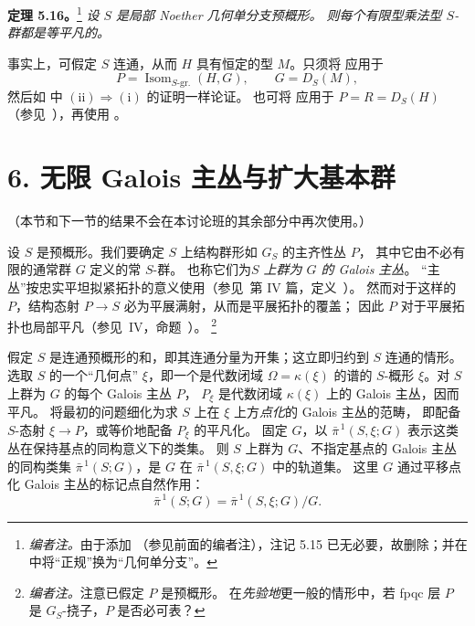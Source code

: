 \par\medskip\noindent
\textbf{定理 5.16。}\footnote{\textit{编者注。}由于添加 
（参见前面的编者注），注记 5.15 已无必要，故删除；并在
 中将“正规”换为“几何单分支”。}\enspace
\emph{设 \(S\) 是局部 Noether 几何单分支预概形。
则每个有限型乘法型 \(S\)-群都是等平凡的。}

事实上，可假定 \(S\) 连通，从而 \(H\) 具有恒定的型 \(M\)。只须将
 应用于
\[
  P=\operatorname{Isom}_{S\text{-gr.}}(H,G),
  \qquad G=D_S(M),
\]
然后如  中
\(\mathrm{(ii)}\Rightarrow\mathrm{(i)}\) 的证明一样论证。
也可将  应用于 \(P=R=D_S(H)\)
（参见\ ），再使用 。

\section*{6. 无限 Galois 主丛与扩大基本群}
{}

（本节和下一节的结果不会在本讨论班的其余部分中再次使用。）

设 \(S\) 是预概形。我们要确定 \(S\) 上结构群形如 \(G_S\) 的主齐性丛 \(P\)，
其中它由不必有限的通常群 \(G\) 定义的常 \(S\)-群。
也称它们为\emph{\(S\) 上群为 \(G\) 的 Galois 主丛}。
“主丛”按忠实平坦拟紧拓扑的意义使用（参见\ 第 IV 篇，定义~）。
然而对于这样的 \(P\)，结构态射 \(P\to S\) 必为平展满射，从而是平展拓扑的覆盖；
因此 \(P\) 对于平展拓扑也局部平凡（参见\ IV，命题~）。
\footnote{\textit{编者注。}注意已假定 \(P\) 是预概形。
在\emph{先验地}更一般的情形中，若 fpqc 层 \(P\) 是 \(G_S\)-挠子，\(P\) 是否必可表？}

假定 \(S\) 是连通预概形的和，即其连通分量为开集；这立即归约到 \(S\) 连通的情形。
选取 \(S\) 的一个“几何点” \(\xi\)，即一个是代数闭域 \(\Omega=\kappa(\xi)\)
的谱的 \(S\)-概形 \(\xi\)。对 \(S\) 上群为 \(G\) 的每个 Galois 主丛 \(P\)，
\(P_\xi\) 是代数闭域 \(\kappa(\xi)\) 上的 Galois 主丛，因而平凡。
将最初的问题细化为求 \(S\) 上在 \(\xi\) 上方\emph{点化}的 Galois 主丛的范畴，
即配备 \(S\)-态射 \(\xi\to P\)，或等价地配备 \(P_\xi\) 的平凡化。
固定 \(G\)，以 \(\bar\pi^{\,1}(S,\xi;G)\) 表示这类丛在保持基点的同构意义下的类集。
则 \(S\) 上群为 \(G\)、不指定基点的 Galois 主丛的同构类集
\(\bar\pi^{\,1}(S;G)\)，是 \(G\) 在 \(\bar\pi^{\,1}(S,\xi;G)\) 中的轨道集。
这里 \(G\) 通过平移点化 Galois 主丛的标记点自然作用：
\[
  \bar\pi^{\,1}(S;G)=\bar\pi^{\,1}(S,\xi;G)/G.
\]

